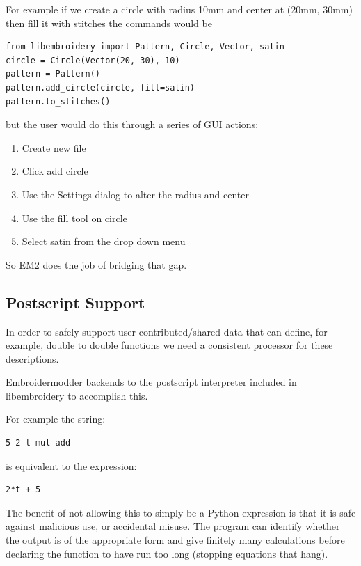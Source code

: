 For example if we create a circle with radius 10mm and center at (20mm, 30mm) then fill it with stitches the commands would be

\begin{lstlisting}
from libembroidery import Pattern, Circle, Vector, satin
circle = Circle(Vector(20, 30), 10)
pattern = Pattern()
pattern.add_circle(circle, fill=satin)
pattern.to_stitches()
\end{lstlisting}

but the user would do this through a series of GUI actions:

\begin{enumerate}
\item Create new file
\item Click add circle
\item Use the Settings dialog to alter the radius and center
\item Use the fill tool on circle
\item Select satin from the drop down menu
\end{enumerate}

So EM2 does the job of bridging that gap.

\subsection{Postscript Support}

In order to safely support user contributed/shared data that can define, for example, double to double functions we need a consistent processor for these descriptions.

Embroidermodder backends to the postscript interpreter included
in libembroidery to accomplish this.

For example the string:

\begin{verbatim}
5 2 t mul add
\end{verbatim}

is equivalent to the expression:

\begin{verbatim}
2*t + 5
\end{verbatim}

The benefit of not allowing this to simply be a Python expression is that it is safe against malicious use, or accidental misuse. The program can identify whether the output is of the appropriate form and give finitely many calculations before declaring the function to have run too long (stopping equations that hang).

